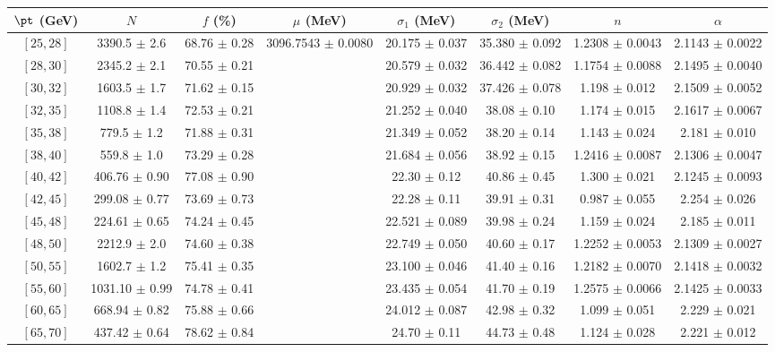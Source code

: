 \begin{tabular}{c||c|c|c|c|c|c|c}
$\pt$ (GeV) & $N$ & $f$ (\%) & $\mu$ (MeV) & $\sigma_1$ (MeV) & $\sigma_2$ (MeV) & $n$ & $\alpha$ \\
\hline
$[25, 28]$ & 3390.5 $\pm$ 2.6 & 68.76 $\pm$ 0.28 & \multirow{19}{*}{3096.7543 $\pm$ 0.0080} & 20.175 $\pm$ 0.037 & 35.380 $\pm$ 0.092 & 1.2308 $\pm$ 0.0043 & 2.1143 $\pm$ 0.0022\\
$[28, 30]$ & 2345.2 $\pm$ 2.1 & 70.55 $\pm$ 0.21 &  & 20.579 $\pm$ 0.032 & 36.442 $\pm$ 0.082 & 1.1754 $\pm$ 0.0088 & 2.1495 $\pm$ 0.0040\\
$[30, 32]$ & 1603.5 $\pm$ 1.7 & 71.62 $\pm$ 0.15 &  & 20.929 $\pm$ 0.032 & 37.426 $\pm$ 0.078 & 1.198 $\pm$ 0.012 & 2.1509 $\pm$ 0.0052\\
$[32, 35]$ & 1108.8 $\pm$ 1.4 & 72.53 $\pm$ 0.21 &  & 21.252 $\pm$ 0.040 & 38.08 $\pm$ 0.10 & 1.174 $\pm$ 0.015 & 2.1617 $\pm$ 0.0067\\
$[35, 38]$ & 779.5 $\pm$ 1.2 & 71.88 $\pm$ 0.31 &  & 21.349 $\pm$ 0.052 & 38.20 $\pm$ 0.14 & 1.143 $\pm$ 0.024 & 2.181 $\pm$ 0.010\\
$[38, 40]$ & 559.8 $\pm$ 1.0 & 73.29 $\pm$ 0.28 &  & 21.684 $\pm$ 0.056 & 38.92 $\pm$ 0.15 & 1.2416 $\pm$ 0.0087 & 2.1306 $\pm$ 0.0047\\
$[40, 42]$ & 406.76 $\pm$ 0.90 & 77.08 $\pm$ 0.90 &  & 22.30 $\pm$ 0.12 & 40.86 $\pm$ 0.45 & 1.300 $\pm$ 0.021 & 2.1245 $\pm$ 0.0093\\
$[42, 45]$ & 299.08 $\pm$ 0.77 & 73.69 $\pm$ 0.73 &  & 22.28 $\pm$ 0.11 & 39.91 $\pm$ 0.31 & 0.987 $\pm$ 0.055 & 2.254 $\pm$ 0.026\\
$[45, 48]$ & 224.61 $\pm$ 0.65 & 74.24 $\pm$ 0.45 &  & 22.521 $\pm$ 0.089 & 39.98 $\pm$ 0.24 & 1.159 $\pm$ 0.024 & 2.185 $\pm$ 0.011\\
$[48, 50]$ & 2212.9 $\pm$ 2.0 & 74.60 $\pm$ 0.38 &  & 22.749 $\pm$ 0.050 & 40.60 $\pm$ 0.17 & 1.2252 $\pm$ 0.0053 & 2.1309 $\pm$ 0.0027\\
$[50, 55]$ & 1602.7 $\pm$ 1.2 & 75.41 $\pm$ 0.35 &  & 23.100 $\pm$ 0.046 & 41.40 $\pm$ 0.16 & 1.2182 $\pm$ 0.0070 & 2.1418 $\pm$ 0.0032\\
$[55, 60]$ & 1031.10 $\pm$ 0.99 & 74.78 $\pm$ 0.41 &  & 23.435 $\pm$ 0.054 & 41.70 $\pm$ 0.19 & 1.2575 $\pm$ 0.0066 & 2.1425 $\pm$ 0.0033\\
$[60, 65]$ & 668.94 $\pm$ 0.82 & 75.88 $\pm$ 0.66 &  & 24.012 $\pm$ 0.087 & 42.98 $\pm$ 0.32 & 1.099 $\pm$ 0.051 & 2.229 $\pm$ 0.021\\
$[65, 70]$ & 437.42 $\pm$ 0.64 & 78.62 $\pm$ 0.84 &  & 24.70 $\pm$ 0.11 & 44.73 $\pm$ 0.48 & 1.124 $\pm$ 0.028 & 2.221 $\pm$ 0.012\\

\end{tabular}
